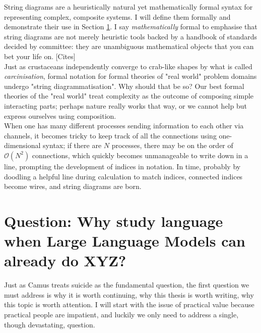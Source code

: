 
String diagrams are a heuristically natural yet mathematically formal syntax for representing complex, composite systems. I will define them formally and demonstrate their use in Section \ref{}. I say \emph{mathematically} formal to emphasise that string diagrams are not merely heuristic tools backed by a handbook of standards decided by committee: they are unambiguous mathematical objects that you can bet your life on. [Cites]\\

Just as crustaceans independently converge to crab-like shapes by what is called \emph{carcinisation}, formal notation for formal theories of "real world" problem domains undergo "string diagrammatisation". Why should that be so? Our best formal theories of the "real world" treat complexity as the outcome of composing simple interacting parts; perhaps nature really works that way, or we cannot help but express ourselves using composition.\\

When one has many different processes sending information to each other via channels, it becomes tricky to keep track of all the connections using one-dimensional syntax; if there are $N$ processes, there may be on the order of $\mathcal{O}(N^2)$ connections, which quickly becomes unmanageable to write down in a line, prompting the development of indices in notation. In time, probably by doodling a helpful line during calculation to match indices, connected indices become wires, and string diagrams are born.

\section{\textbf{Question:} Why study language when Large Language Models can already do XYZ?}

Just as Camus treats suicide as the fundamental question, the first question we must address is why it is worth continuing, why this thesis is worth writing, why this topic is worth attention. I will start with the issue of practical value because practical people are impatient, and luckily we only need to address a single, though devastating, question.\\

